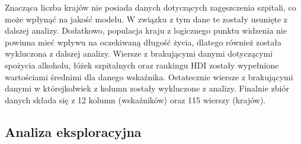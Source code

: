 \documentclass{article}
\begin{document}
Znacząca liczba krajów nie posiada danych dotyczących zagęszczenia szpitali, co może wpłynąć na jakość modelu. W związku z tym dane te zostały usunięte z dalszej analizy.
Dodatkowo, populacja kraju z logicznego punktu widzenia nie powinna mieć wpływu na oczekiwaną długość życia, dlatego również została wykluczona z dalszej analizy.
Wiersze z brakującymi danymi dotyczącymi spożycia alkoholu, łóżek szpitalnych oraz rankingu HDI zostały wypełnione wartościami średnimi dla danego wskaźnika. 
Ostatecznie wiersze z brakującymi danymi w którejkolwiek z kolumn zostały wykluczone z analizy. Finalnie zbiór danych składa się z 12 kolumn (wskaźników) oraz 115 wierszy (krajów).

\pagebreak
\subsection{Analiza eksploracyjna}
\end{document}
